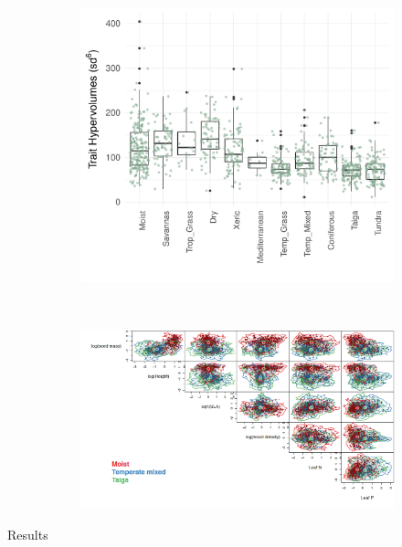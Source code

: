 \documentclass[final]{beamer}
\newlength{\twocolwid}
\begin{document}
\begin{frame}[t]
\begin{columns}[t]
\begin{column}{\twocolwid}
	\begin{figure}[ht!]
	\centering
	\begin{subfigure}[t]{.5\textwidth}
		\centering
		\includegraphics[width=\linewidth]{./figures/Hypervolume_sp_sample_gaussian20perc.pdf}
		\caption{}
		\label{}
	\end{subfigure}%
	~
	\begin{subfigure}[t]{.5\textwidth}
		\centering
		\includegraphics[width=\linewidth]{./figures/Hypervolumes.png}
		\caption{}
		\label{}
	\end{subfigure}
	\caption{}
	\label{}
\end{figure}




		 \begin{block}{Results}
		 

\end{block}
\end{column}
\end{columns}
\end{frame}
\end{document}
